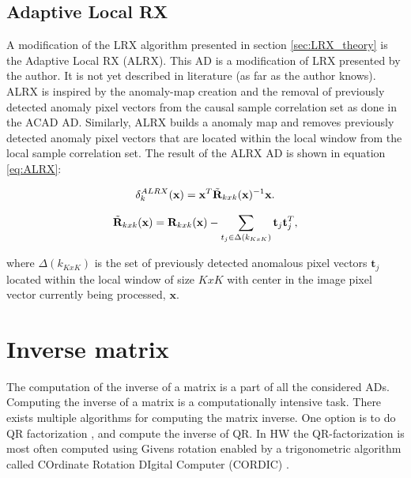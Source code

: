 

\subsection{Adaptive Local RX}
\label{sec:Adaptive_LRX_theory}
A modification of the LRX algorithm presented in section \ref{sec:LRX_theory} is the Adaptive Local RX (ALRX). This AD is a modification of LRX presented by the author. It is not yet described in literature (as far as the author knows). 
\\

ALRX is inspired by the anomaly-map creation and the removal of previously detected anomaly pixel vectors from the causal sample correlation set as done in the ACAD AD. Similarly, ALRX builds a anomaly map and removes previously detected anomaly pixel vectors that are located within the local window from the local sample correlation set. The result of the ALRX AD is shown in equation \ref{eq:ALRX}: 

\begin{equation}
    \delta_k^{ALRX}(\textbf{x}) = \textbf{x}^T\Tilde{\textbf{R}}_{k x k}(\textbf{x})^{-1}\textbf{x}.
    \label{eq:ALRX}
\end{equation}


\begin{equation}
   \Tilde{\textbf{R}}_{k x k}(\textbf{x})= \textbf{R}_{k x k}(\textbf{x})-\sum_{t_j\in\Delta(k_{KxK})}\textbf{t}_j\textbf{t}_j^T,
    \label{eq:ALRX_anomaly_removed}
\end{equation}

where $\Delta(k_{KxK})$ is the set of previously detected anomalous pixel vectors $\textbf{t}_j$ located within the local window of size $KxK$ with center in the image pixel vector currently being processed, $\textbf{x}$.

\section{Inverse matrix}
The computation of the inverse of a matrix is a part of all the considered ADs. Computing the inverse of a matrix is a computationally intensive task. There exists multiple algorithms for computing the matrix inverse. One option is to do QR factorization \cite{QRD_fpga}, and compute the inverse of QR. In HW the QR-factorization is most often computed using Givens rotation enabled by a trigonometric algorithm called COrdinate Rotation DIgital Computer (CORDIC) \cite{CORDIC}. \\

